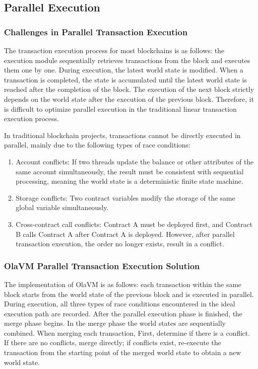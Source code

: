 \subsection{Parallel Execution}\label{section: parallel-execution}

\subsubsection{Challenges in Parallel Transaction Execution}

The transaction execution process for most blockchains is as follows: the execution module sequentially retrieves transactions from the block and executes them one by one. During execution, the latest world state is modified. When a transaction is completed, the state is accumulated until the latest world state is reached after the completion of the block. The execution of the next block strictly depends on the world state after the execution of the previous block. Therefore, it is difficult to optimize parallel execution in the traditional linear transaction execution process.

In traditional blockchain projects, transactions cannot be directly executed in parallel, mainly due to the following types of race conditions:

\begin{enumerate}
    \item Account conflicts: If two threads update the balance or other attributes of the same account simultaneously, the result must be consistent with sequential processing, meaning the world state is a deterministic finite state machine.
    \item Storage conflicts: Two contract variables modify the storage of the same global variable simultaneously.
    \item Cross-contract call conflicts: Contract A must be deployed first, and Contract B calls Contract A after Contract A is deployed. However, after parallel transaction execution, the order no longer exists, result in a conflict.
\end{enumerate}

\subsubsection{OlaVM Parallel Transaction Execution Solution}

The implementation of OlaVM is as follows: each transaction within the same block starts from the world state of the previous block and is executed in parallel. During execution, all three types of race conditions encountered in the ideal execution path are recorded. After the parallel execution phase is finished, the merge phase begins. In the merge phase the world states are sequentially combined. When merging each transaction, First, determine if there is a conflict.  If there are no conflicts, merge directly; if conflicts exist, re-execute the transaction from the starting point of the merged world state to obtain a new world state.

